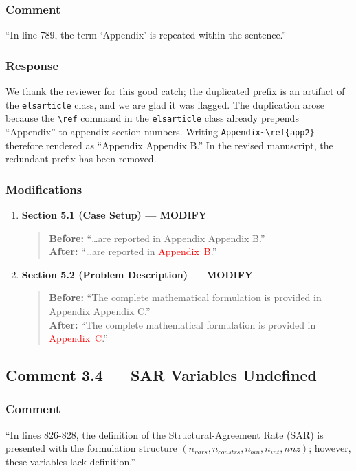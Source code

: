 \documentclass[11pt,a4paper]{article}
\begin{document}
\subsubsection{Comment}
``In line 789, the term `Appendix' is repeated within the sentence.''

\subsubsection{Response}
We thank the reviewer for this good catch; the duplicated prefix is an artifact of the \texttt{elsarticle} class, and we are glad it was flagged. The duplication arose because the \texttt{\textbackslash ref} command in the \texttt{elsarticle} class already prepends ``Appendix'' to appendix section numbers. Writing \texttt{Appendix\~{}\textbackslash ref\{app2\}} therefore rendered as ``Appendix Appendix B.'' In the revised manuscript, the redundant prefix has been removed.

\subsubsection{Modifications}
\begin{enumerate}
\item \textbf{Section 5.1 (Case Setup) --- MODIFY}
\begin{quote}
\textbf{Before:} ``\ldots are reported in Appendix Appendix B.''\\[4pt]
\textbf{After:} ``\ldots are reported in \textcolor{red}{Appendix~B}.''
\end{quote}
\item \textbf{Section 5.2 (Problem Description) --- MODIFY}
\begin{quote}
\textbf{Before:} ``The complete mathematical formulation is provided in Appendix Appendix C.''\\[4pt]
\textbf{After:} ``The complete mathematical formulation is provided in \textcolor{red}{Appendix~C}.''
\end{quote}
\end{enumerate}

\subsection{Comment 3.4 --- SAR Variables Undefined}

\subsubsection{Comment}
``In lines 826-828, the definition of the Structural-Agreement Rate (SAR) is presented with the formulation structure $(n_{vars}, n_{constrs}, n_{bin}, n_{int}, nnz)$; however, these variables lack definition.''
\end{document}
